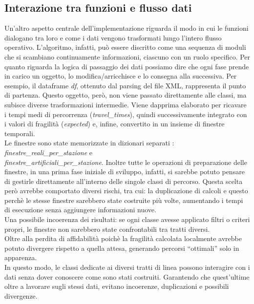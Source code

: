 \documentclass{report}
\begin{document}
\subsection{Interazione tra funzioni e flusso dati}
Un'altro aspetto centrale dell’implementazione riguarda il modo in cui le funzioni dialogano tra loro e come i dati vengono trasformati lungo l’intero flusso operativo. L’algoritmo, infatti, può essere discritto come una sequenza di moduli che si scambiano continuamente informazioni, ciascuno con un ruolo specifico.
Per quanto riguarda la logica di passaggio dei dati possiamo dire che ogni fase prende in carico un oggetto, lo modifica/arricchisce e lo consegna alla successiva.
Per esempio, il dataframe \textit{df}, ottenuto dal parsing del file XML, rappresenta il punto di partenza. Questo oggetto, però, non viene passato direttamente alle classi, ma subisce diverse trasformazioni intermedie. Viene dapprima elaborato per ricavare i tempi medi di percorrenza (\textit{travel\_times}), quindi successivamente integrato con i valori di fragilità (\textit{expected}) e, infine, convertito in un insieme di finestre temporali. \\ Le finestre sono state memorizzate in dizionari separati :  \textit{finestre\_reali\_per\_stazione} e \\ \textit{finestre\_artificiali\_per\_stazione}. Inoltre tutte le operazioni di preparazione delle finestre, in una prima fase iniziale di sviluppo, infatti, si sarebbe potuto pensare di gestirle direttamente all’interno delle singole classi di percorso. Questa scelta però avrebbe comportato diversi rischi, tra cui: la duplicazione di calcoli e questo perchè le stesse finestre sarebbero state costruite più volte, aumentando i tempi di esecuzione senza aggiungere informazioni nuove. \\ Una possibile incoerenza dei risultati: se ogni classe avesse applicato filtri o criteri propri, le finestre non sarebbero state confrontabili tra tratti diversi. \\ Oltre alla perdita di affidabilità poichè la fragilità calcolata localmente avrebbe potuto divergere rispetto a quella attesa, generando percorsi “ottimali” solo in apparenza. \\ In questo modo, le classi dedicate ai diversi tratti di linea possono interagire con i dati senza dover conoscere come sono stati costruiti. Garantendo che quest'ultime oltre a lavorare sugli stessi dati, evitano incoerenze, duplicazioni e possibili divergenze.
\end{document}
